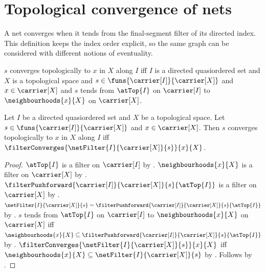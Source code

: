 \section{Topological convergence of nets}





A net converges when it tends from the final-segment filter of its directed
index.  This definition keeps the index order explicit, so the same graph can
be considered with different notions of eventuality.

\begin{definition}\label{topological_net_convergence}
    $s$ converges topologically to $x$ in $X$ along $I$ iff
        $I$ is a directed quasiordered set and
        $X$ is a topological space and
        $s\in\funs{\carrier[I]}{\carrier[X]}$ and
        $x\in\carrier[X]$ and
        $s$ tends from $\atTop{I}$ on $\carrier[I]$ to
            $\neighbourhoods{x}{X}$ on $\carrier[X]$.
\end{definition}

\begin{theorem}\label{topological_net_convergence_iff_filter_convergence}
    Let $I$ be a directed quasiordered set and $X$ be a topological space.
    Let $s\in\funs{\carrier[I]}{\carrier[X]}$ and
        $x\in\carrier[X]$.
    Then $s$ converges topologically to $x$ in $X$ along $I$ iff
        $\filterConverges{\netFilter{I}{\carrier[X]}{s}}{x}{X}$.
\end{theorem}
\begin{proof}
    $\atTop{I}$ is a filter on $\carrier[I]$ by
        .
    $\neighbourhoods{x}{X}$ is a filter on $\carrier[X]$ by
        .
    $\filterPushforward{\carrier[I]}{\carrier[X]}{s}{\atTop{I}}$ is a
        filter on $\carrier[X]$ by
        .
    $\netFilter{I}{\carrier[X]}{s}
        =\filterPushforward{\carrier[I]}{\carrier[X]}{s}{\atTop{I}}$ by
        .
    $s$ tends from $\atTop{I}$ on $\carrier[I]$ to
        $\neighbourhoods{x}{X}$ on $\carrier[X]$ iff
        $\neighbourhoods{x}{X}\subseteq
            \filterPushforward{\carrier[I]}{\carrier[X]}{s}{\atTop{I}}$ by
        .
    $\filterConverges{\netFilter{I}{\carrier[X]}{s}}{x}{X}$ iff
        $\neighbourhoods{x}{X}\subseteq
            \netFilter{I}{\carrier[X]}{s}$ by
        .
    Follows by .
\end{proof}

